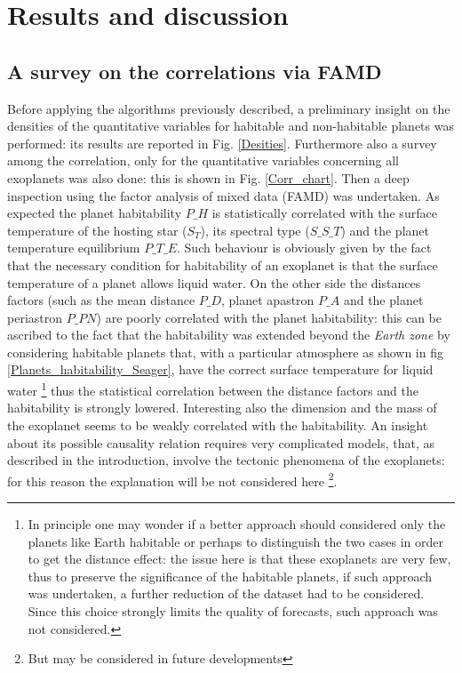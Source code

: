 \documentclass[
12pt, %
a4paper, %
oneside, %
headinclude,footinclude, %
BCOR5mm, %
]{scrartcl}
\begin{document}
\section{Results and discussion}


\subsection{A survey on the correlations via FAMD}

Before applying the algorithms previously described, a preliminary insight on the densities of the quantitative variables for habitable and non-habitable planets was performed: its results are reported in Fig. \ref{Desities}. Furthermore also a survey among the correlation, only for the quantitative variables concerning all exoplanets was also done: this is shown in Fig. \ref{Corr_chart}. Then a deep inspection using the factor analysis of mixed data (FAMD) was undertaken.  As expected the planet habitability $P\_H$ is statistically correlated with the surface temperature of the hosting star ($S_T$), its spectral type ($S\_S\_T$) and the planet temperature equilibrium $P\_T\_E$. Such behaviour is obviously given by the fact that the necessary condition for habitability of an exoplanet is that the surface temperature of a planet allows liquid water. On the other side the distances factors (such as the mean distance $P\_D$, planet apastron $P\_A$ and the planet periastron $P\_PN$) are poorly correlated with the planet habitability: this can be ascribed to the fact that the habitability was extended beyond the \textit{Earth zone} by considering habitable planets that, with a particular atmosphere as shown in fig \ref{Planets_habitability_Seager}, have the correct surface temperature for liquid water
\footnote{In principle one may wonder if a better approach should considered only the planets like Earth habitable or perhaps to distinguish the two cases in order to get the distance effect: the issue here is that these exoplanets are very few, thus to preserve the significance of the habitable planets, if such approach was undertaken, a further reduction of the dataset had to be considered. Since this choice strongly limits the quality of forecasts, such approach was not considered.} thus the statistical correlation between the distance factors and the habitability is strongly lowered. Interesting also the dimension and the mass of the exoplanet seems to be weakly correlated with the habitability. An insight about its possible causality relation requires very complicated models, that, as described in the introduction, involve the tectonic phenomena of the exoplanets: for this reason the explanation will be not considered here \footnote{But may be considered in future developments}.
\end{document}
